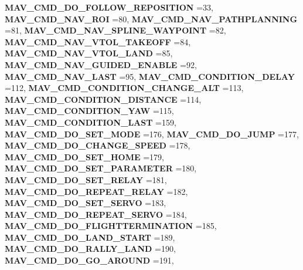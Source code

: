 \begin{DoxyCompactItemize}
\textbf{ M\+A\+V\+\_\+\+C\+M\+D\+\_\+\+D\+O\+\_\+\+F\+O\+L\+L\+O\+W\+\_\+\+R\+E\+P\+O\+S\+I\+T\+I\+ON} =33, 
\textbf{ M\+A\+V\+\_\+\+C\+M\+D\+\_\+\+N\+A\+V\+\_\+\+R\+OI} =80, 
\textbf{ M\+A\+V\+\_\+\+C\+M\+D\+\_\+\+N\+A\+V\+\_\+\+P\+A\+T\+H\+P\+L\+A\+N\+N\+I\+NG} =81, 
\newline
\textbf{ M\+A\+V\+\_\+\+C\+M\+D\+\_\+\+N\+A\+V\+\_\+\+S\+P\+L\+I\+N\+E\+\_\+\+W\+A\+Y\+P\+O\+I\+NT} =82, 
\textbf{ M\+A\+V\+\_\+\+C\+M\+D\+\_\+\+N\+A\+V\+\_\+\+V\+T\+O\+L\+\_\+\+T\+A\+K\+E\+O\+FF} =84, 
\textbf{ M\+A\+V\+\_\+\+C\+M\+D\+\_\+\+N\+A\+V\+\_\+\+V\+T\+O\+L\+\_\+\+L\+A\+ND} =85, 
\textbf{ M\+A\+V\+\_\+\+C\+M\+D\+\_\+\+N\+A\+V\+\_\+\+G\+U\+I\+D\+E\+D\+\_\+\+E\+N\+A\+B\+LE} =92, 
\newline
\textbf{ M\+A\+V\+\_\+\+C\+M\+D\+\_\+\+N\+A\+V\+\_\+\+L\+A\+ST} =95, 
\textbf{ M\+A\+V\+\_\+\+C\+M\+D\+\_\+\+C\+O\+N\+D\+I\+T\+I\+O\+N\+\_\+\+D\+E\+L\+AY} =112, 
\textbf{ M\+A\+V\+\_\+\+C\+M\+D\+\_\+\+C\+O\+N\+D\+I\+T\+I\+O\+N\+\_\+\+C\+H\+A\+N\+G\+E\+\_\+\+A\+LT} =113, 
\textbf{ M\+A\+V\+\_\+\+C\+M\+D\+\_\+\+C\+O\+N\+D\+I\+T\+I\+O\+N\+\_\+\+D\+I\+S\+T\+A\+N\+CE} =114, 
\newline
\textbf{ M\+A\+V\+\_\+\+C\+M\+D\+\_\+\+C\+O\+N\+D\+I\+T\+I\+O\+N\+\_\+\+Y\+AW} =115, 
\textbf{ M\+A\+V\+\_\+\+C\+M\+D\+\_\+\+C\+O\+N\+D\+I\+T\+I\+O\+N\+\_\+\+L\+A\+ST} =159, 
\textbf{ M\+A\+V\+\_\+\+C\+M\+D\+\_\+\+D\+O\+\_\+\+S\+E\+T\+\_\+\+M\+O\+DE} =176, 
\textbf{ M\+A\+V\+\_\+\+C\+M\+D\+\_\+\+D\+O\+\_\+\+J\+U\+MP} =177, 
\newline
\textbf{ M\+A\+V\+\_\+\+C\+M\+D\+\_\+\+D\+O\+\_\+\+C\+H\+A\+N\+G\+E\+\_\+\+S\+P\+E\+ED} =178, 
\textbf{ M\+A\+V\+\_\+\+C\+M\+D\+\_\+\+D\+O\+\_\+\+S\+E\+T\+\_\+\+H\+O\+ME} =179, 
\textbf{ M\+A\+V\+\_\+\+C\+M\+D\+\_\+\+D\+O\+\_\+\+S\+E\+T\+\_\+\+P\+A\+R\+A\+M\+E\+T\+ER} =180, 
\textbf{ M\+A\+V\+\_\+\+C\+M\+D\+\_\+\+D\+O\+\_\+\+S\+E\+T\+\_\+\+R\+E\+L\+AY} =181, 
\newline
\textbf{ M\+A\+V\+\_\+\+C\+M\+D\+\_\+\+D\+O\+\_\+\+R\+E\+P\+E\+A\+T\+\_\+\+R\+E\+L\+AY} =182, 
\textbf{ M\+A\+V\+\_\+\+C\+M\+D\+\_\+\+D\+O\+\_\+\+S\+E\+T\+\_\+\+S\+E\+R\+VO} =183, 
\textbf{ M\+A\+V\+\_\+\+C\+M\+D\+\_\+\+D\+O\+\_\+\+R\+E\+P\+E\+A\+T\+\_\+\+S\+E\+R\+VO} =184, 
\textbf{ M\+A\+V\+\_\+\+C\+M\+D\+\_\+\+D\+O\+\_\+\+F\+L\+I\+G\+H\+T\+T\+E\+R\+M\+I\+N\+A\+T\+I\+ON} =185, 
\newline
\textbf{ M\+A\+V\+\_\+\+C\+M\+D\+\_\+\+D\+O\+\_\+\+L\+A\+N\+D\+\_\+\+S\+T\+A\+RT} =189, 
\textbf{ M\+A\+V\+\_\+\+C\+M\+D\+\_\+\+D\+O\+\_\+\+R\+A\+L\+L\+Y\+\_\+\+L\+A\+ND} =190, 
\textbf{ M\+A\+V\+\_\+\+C\+M\+D\+\_\+\+D\+O\+\_\+\+G\+O\+\_\+\+A\+R\+O\+U\+ND} =191, 

\end{DoxyCompactItemize}
